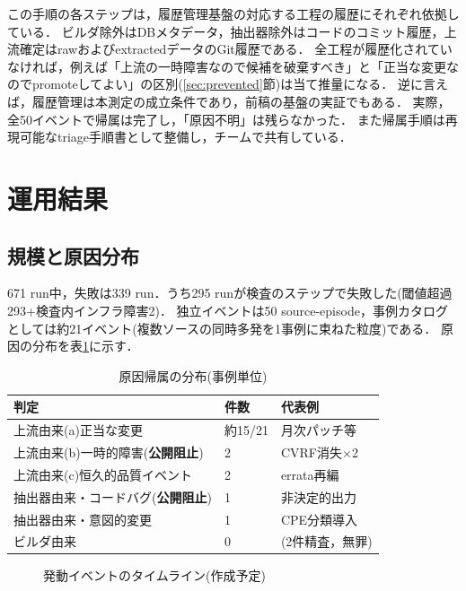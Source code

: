\documentclass{css}
\begin{document}
この手順の各ステップは，履歴管理基盤\cite{nakaoka2025}の対応する工程の履歴にそれぞれ依拠している．
ビルダ除外はDBメタデータ，抽出器除外はコードのコミット履歴，上流確定はrawおよびextractedデータのGit履歴である．
全工程が履歴化されていなければ，例えば「上流の一時障害なので候補を破棄すべき」と「正当な変更なのでpromoteしてよい」の区別(\ref{sec:prevented}節)は当て推量になる．
逆に言えば，履歴管理は本測定の成立条件であり，前稿の基盤の実証でもある．
実際，全50イベントで帰属は完了し，「原因不明」は残らなかった．
また帰属手順は再現可能なtriage手順書として整備し，チームで共有している．

\section{運用結果}
\label{sec:results}

\subsection{規模と原因分布}
\label{sec:scale}

671 run中，失敗は339 run．うち295 runが検査のステップで失敗した(閾値超過293+検査内インフラ障害2)．
独立イベントは50 source-episode，事例カタログとしては約21イベント(複数ソースの同時多発を1事例に束ねた粒度)である．
原因の分布を表\ref{tab:attribution}に示す．

\begin{table}[tb]
\caption{原因帰属の分布(事例単位)}
\label{tab:attribution}
\centering
\small
\begin{tabular}{lll}
\hline
判定 & 件数 & 代表例 \\
\hline
上流由来(a)正当な変更 & 約15/21 & 月次パッチ等 \\
上流由来(b)一時的障害(\textbf{公開阻止}) & 2 & CVRF消失$\times$2 \\
上流由来(c)恒久的品質イベント & 2 & errata再編 \\
抽出器由来・コードバグ(\textbf{公開阻止}) & 1 & 非決定的出力 \\
抽出器由来・意図的変更 & 1 & CPE分類導入 \\
ビルダ由来 & 0 & (2件精査，無罪) \\
\hline
\end{tabular}
\end{table}

\begin{figure}[tb]
\centering
{}
\caption{発動イベントのタイムライン(作成予定)}
\label{fig:timeline}
\end{figure}
\end{document}
